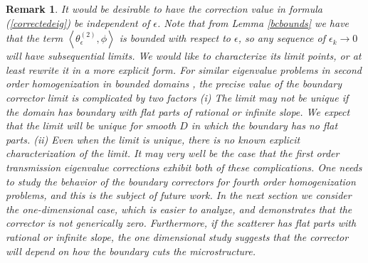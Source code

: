 \documentclass[12pt]{article}
\newtheorem{remark}{Remark}
\begin{document}
\begin{remark}
{\em It would be desirable to have the correction value in formula (\ref{correctedeig}) be independent of $\epsilon$. 
Note that from Lemma \ref{bcbounds} we have that the term $\left<\theta_\epsilon^{(2)}, \phi\right>$ is bounded with respect to $\epsilon$, so any sequence of $\epsilon_k\rightarrow 0$ will have subsequential limits. We would like to characterize its limit points, or at least rewrite it in a more explicit form.  For similar eigenvalue problems in second order homogenization in bounded domains \cite{GeMa1, GeMa2, MoVo1, MoVo2, SaVo}, the precise value of the boundary corrector limit is complicated by two factors 
(i) The limit may not be unique if the domain has boundary with flat parts of rational or infinite slope. We expect that the limit will be unique for smooth $D$ in which the boundary has no flat parts. (ii)  Even when the limit is unique, there is no known explicit characterization of the limit.  It may very well be the case that the first order transmission eigenvalue corrections exhibit both of these complications.  One needs to study the behavior of the boundary correctors for fourth order homogenization problems, and this is the subject of future work.  In the next section we consider the one-dimensional case, which is easier to analyze, and demonstrates that the corrector is not generically zero. Furthermore, if the scatterer has flat parts with rational or infinite slope, the one dimensional study suggests that the corrector will depend on how the boundary cuts the microstructure.}
\end{remark}
\end{document}
